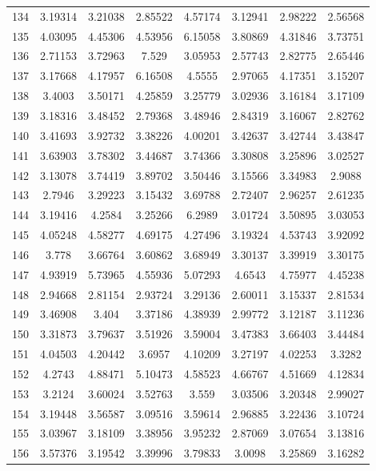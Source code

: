 \begin{center}
\begin{longtable}{cccccccc}
134 & 3.19314 & 3.21038 & 2.85522 & 4.57174 & 3.12941 & 2.98222 & 2.56568\\
135 & 4.03095 & 4.45306 & 4.53956 & 6.15058 & 3.80869 & 4.31846 & 3.73751\\
136 & 2.71153 & 3.72963 & 7.529 & 3.05953 & 2.57743 & 2.82775 & 2.65446\\
137 & 3.17668 & 4.17957 & 6.16508 & 4.5555 & 2.97065 & 4.17351 & 3.15207\\
138 & 3.4003 & 3.50171 & 4.25859 & 3.25779 & 3.02936 & 3.16184 & 3.17109\\
139 & 3.18316 & 3.48452 & 2.79368 & 3.48946 & 2.84319 & 3.16067 & 2.82762\\
140 & 3.41693 & 3.92732 & 3.38226 & 4.00201 & 3.42637 & 3.42744 & 3.43847\\
141 & 3.63903 & 3.78302 & 3.44687 & 3.74366 & 3.30808 & 3.25896 & 3.02527\\
142 & 3.13078 & 3.74419 & 3.89702 & 3.50446 & 3.15566 & 3.34983 & 2.9088\\
143 & 2.7946 & 3.29223 & 3.15432 & 3.69788 & 2.72407 & 2.96257 & 2.61235\\
144 & 3.19416 & 4.2584 & 3.25266 & 6.2989 & 3.01724 & 3.50895 & 3.03053\\
145 & 4.05248 & 4.58277 & 4.69175 & 4.27496 & 3.19324 & 4.53743 & 3.92092\\
146 & 3.778 & 3.66764 & 3.60862 & 3.68949 & 3.30137 & 3.39919 & 3.30175\\
147 & 4.93919 & 5.73965 & 4.55936 & 5.07293 & 4.6543 & 4.75977 & 4.45238\\
148 & 2.94668 & 2.81154 & 2.93724 & 3.29136 & 2.60011 & 3.15337 & 2.81534\\
149 & 3.46908 & 3.404 & 3.37186 & 4.38939 & 2.99772 & 3.12187 & 3.11236\\
150 & 3.31873 & 3.79637 & 3.51926 & 3.59004 & 3.47383 & 3.66403 & 3.44484\\
151 & 4.04503 & 4.20442 & 3.6957 & 4.10209 & 3.27197 & 4.02253 & 3.3282\\
152 & 4.2743 & 4.88471 & 5.10473 & 4.58523 & 4.66767 & 4.51669 & 4.12834\\
153 & 3.2124 & 3.60024 & 3.52763 & 3.559 & 3.03506 & 3.20348 & 2.99027\\
154 & 3.19448 & 3.56587 & 3.09516 & 3.59614 & 2.96885 & 3.22436 & 3.10724\\
155 & 3.03967 & 3.18109 & 3.38956 & 3.95232 & 2.87069 & 3.07654 & 3.13816\\
156 & 3.57376 & 3.19542 & 3.39996 & 3.79833 & 3.0098 & 3.25869 & 3.16282\\

\end{longtable}
\end{center}
